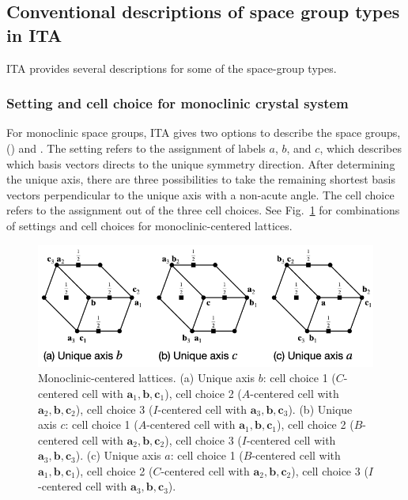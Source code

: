 
\subsection{Conventional descriptions of space group types in ITA}

ITA provides several descriptions for some of the space-group types.

\subsubsection{Setting and cell choice for monoclinic crystal system}

For monoclinic space groups, ITA gives two options to describe the space groups,  () and .
The setting refers to the assignment of labels $a$, $b$, and $c$, which describes which basis vectors directs to the unique symmetry direction.
After determining the unique axis, there are three possibilities to take the remaining shortest basis vectors perpendicular to the unique axis with a non-acute angle.
The cell choice refers to the assignment out of the three cell choices.
See Fig.~\ref{fig:monoclinic-choices} for combinations of settings and cell choices for monoclinic-centered lattices.

\begin{figure}[htb]
  \centering
  \includegraphics[width=\textwidth]{figure/fig_monoclinic_settings_cell_choices.png}
  \caption{
    Monoclinic-centered lattices.
    (a) Unique axis $b$:
      cell choice 1 ($C$-centered cell with $\bm{a}_{1}, \bm{b}, \bm{c}_{1}$),
      cell choice 2 ($A$-centered cell with $\bm{a}_{2}, \bm{b}, \bm{c}_{2}$),
      cell choice 3 ($I$-centered cell with $\bm{a}_{3}, \bm{b}, \bm{c}_{3}$).
    (b) Unique axis $c$:
      cell choice 1 ($A$-centered cell with $\bm{a}_{1}, \bm{b}, \bm{c}_{1}$),
      cell choice 2 ($B$-centered cell with $\bm{a}_{2}, \bm{b}, \bm{c}_{2}$),
      cell choice 3 ($I$-centered cell with $\bm{a}_{3}, \bm{b}, \bm{c}_{3}$).
    (c) Unique axis $a$:
      cell choice 1 ($B$-centered cell with $\bm{a}_{1}, \bm{b}, \bm{c}_{1}$),
      cell choice 2 ($C$-centered cell with $\bm{a}_{2}, \bm{b}, \bm{c}_{2}$),
      cell choice 3 ($I$-centered cell with $\bm{a}_{3}, \bm{b}, \bm{c}_{3}$).
  }
  \label{fig:monoclinic-choices}
\end{figure}

